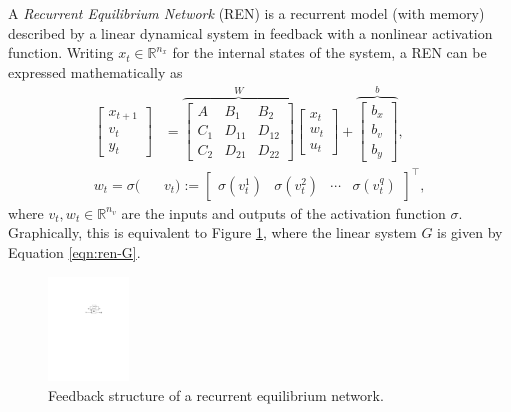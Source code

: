 A \textit{Recurrent Equilibrium Network} (REN) is a recurrent model (with memory) described by a linear dynamical system in feedback with a nonlinear activation function. Writing $x_t \in \mathbb{R}^{n_x}$ for the internal states of the system, a REN can be expressed mathematically as
\begin{align}
    \begin{bmatrix}
        x_{t+1} \\ v_t \\ y_t
    \end{bmatrix}&=
    \overset{W}{\overbrace{
    		\left[
    		\begin{array}{c|cc}
    		A & B_1 & B_2 \\ \hline 
    		C_{1} & D_{11} & D_{12} \\
    		C_{2} & D_{21} & D_{22}
    		\end{array} 
    		\right]
    }}
    \begin{bmatrix}
        x_t \\ w_t \\ u_t
    \end{bmatrix}+
    \overset{b}{\overbrace{
    		\begin{bmatrix}
    		b_x \\ b_v \\ b_y
    		\end{bmatrix}
    }}, \label{eqn:ren-G}\\
    w_t=\sigma(&v_t):=\begin{bmatrix}
    \sigma(v_{t}^1) & \sigma(v_{t}^2) & \cdots & \sigma(v_{t}^q)
    \end{bmatrix}^\top, \label{eqn:ren-sigma}
\end{align}
where $v_t, w_t \in \mathbb{R}^{n_v}$ are the inputs and outputs of the activation function $\sigma$. Graphically, this is equivalent to Figure \ref{fig:ren}, where the linear system $G$ is given by Equation \ref{eqn:ren-G}.

\begin{figure}[h]
    \centering
    \includegraphics[width=0.19\textwidth]{Images/ren.pdf}
    \vspace{-2mm}
    \caption{Feedback structure of a recurrent equilibrium network.}
    \label{fig:ren}
\end{figure}

